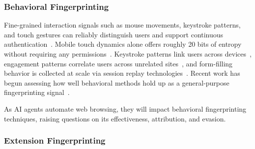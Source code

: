 \subsubsection{Behavioral Fingerprinting} 
\label{sec:stateless-techniques-behavioral-fingperinting}

Fine-grained interaction signals such as mouse movements, keystroke patterns, and touch gestures can reliably distinguish users and support continuous authentication~\cite{attererKnowingUsersEvery2006,zhengEfficientUserVerification2011,leivaMyMouseMy2021,fereidooniAuthentiSenseScalableBehavioral2023}.
Mobile touch dynamics alone offers roughly 20 bits of entropy without requiring any permissions~\cite{masoodTouchYoureTrappcked2018}.
%
%
Keystroke patterns link users across devices~\cite{yuanCrossdeviceTrackingIdentification2018}, engagement patterns correlate users across unrelated sites~\cite{gogaExploitingInnocuousActivity2013}, and form-filling behavior is collected at scale via session replay technologies~\cite{linFillBlanksEmpirical2020,cuiUnderstandingPrivacyNorms2025,acarNoBoundariesData2020}.
%
Recent work has begun assessing how well behavioral methods hold up as a general-purpose fingerprinting signal~\cite{crichtonRethinkingFingerprintingAssessment2025}.

\begin{opbox}
As AI agents automate web browsing, they will impact behavioral fingerprinting techniques, raising questions on its effectiveness, attribution, and evasion.
\end{opbox}


\subsubsection{Extension Fingerprinting} 
\label{sec:stateless-techniques-extension-fingperinting}

